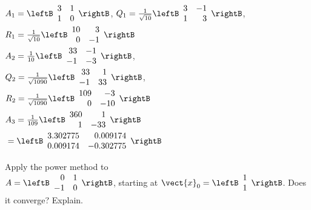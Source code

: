 \begin{multicols}{2}
\begin{ex}
\begin{sol}
\begin{enumerate}[label={\alph*.}]
$A_{1} = \leftB \begin{array}{rr}
3 & 1 \\
1 & 0
\end{array}\rightB$, $Q_{1} = \frac{1}{\sqrt{10}}\leftB \begin{array}{rr}
3 & -1 \\
1 & 3
\end{array}\rightB$, $R_{1} = \frac{1}{\sqrt{10}}\leftB \begin{array}{rr}
10 & 3 \\
0 & -1
\end{array}\rightB$ \\
$A_{2} = \frac{1}{10}\leftB \begin{array}{rr}
33 & -1 \\
-1 & -3
\end{array}\rightB$, \\ $Q_{2} = \frac{1}{\sqrt{1090}}\leftB \begin{array}{rr}
33 & 1 \\
-1 & 33
\end{array}\rightB$, \\ $R_{2} = \frac{1}{\sqrt{1090}}\leftB \begin{array}{rr}
109 & -3 \\
0 & -10
\end{array}\rightB$ \\
$A_{3} = \frac{1}{109}\leftB \begin{array}{rr}
360 & 1 \\
1 & -33
\end{array}\rightB$ \\ ${} = \leftB \begin{array}{rr}
3.302775 & 0.009174 \\
0.009174 & -0.302775
\end{array}\rightB$

\end{enumerate}
\end{sol}
\end{ex}

\begin{ex}
Apply the power method to \\ $A = \leftB \begin{array}{rr}
0 & 1 \\
-1 & 0
\end{array}\rightB$, starting at $\vect{x}_{0} = \leftB \begin{array}{rr}
1 \\
1 
\end{array}\rightB$. Does it converge? Explain.
\end{ex}




\end{multicols}
